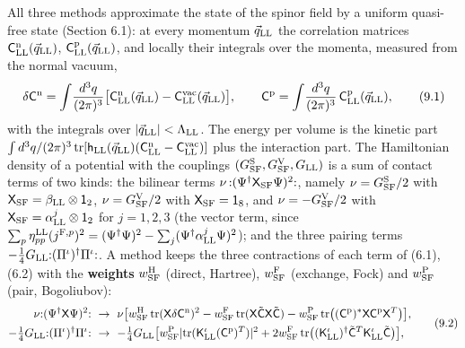 \documentclass[
  10pt,
]{article}
\begin{document}
All three methods approximate the state of the spinor field by a uniform
quasi-free state (Section 6.1): at every momentum \(\vec q_{\rm LL}\)
the correlation matrices
\(\mathsf C^{\rm n}_{\rm LL}(\vec q_{\rm LL})\),
\(\mathsf C^{\rm p}_{\rm LL}(\vec q_{\rm LL})\), and locally their
integrals over the momenta, measured from the normal vacuum,
\[\delta\mathsf C^{\rm n}=\int\!\frac{d^3q}{(2\pi)^3}\big[\mathsf C^{\rm n}_{\rm LL}(\vec q_{\rm LL})-\mathsf C^{\rm vac}_{\rm LL}(\vec q_{\rm LL})\big],\qquad\mathsf C^{\rm p}=\int\!\frac{d^3q}{(2\pi)^3}\,\mathsf C^{\rm p}_{\rm LL}(\vec q_{\rm LL}),\tag{9.1}\]
with the integrals over
\(\lvert\vec q_{\rm LL}\rvert<\Lambda_{\rm LL}\). The energy per volume
is the kinetic part
\(\int d^3q/(2\pi)^3\,\mathrm{tr}[\mathsf h_{\rm LL}(\vec q_{\rm LL})(\mathsf C^{\rm n}_{\rm LL}-\mathsf C^{\rm vac}_{\rm LL})]\)
plus the interaction part. The Hamiltonian density of a potential with
the couplings \((G^{\rm S}_{\rm SF},G^{\rm V}_{\rm SF},G_{\rm LL})\) is
a sum of contact terms of two kinds: the bilinear terms
\(\nu\,{:}(\Psi^\dagger\mathsf X_{\rm SF}\Psi)^2{:}\), namely
\(\nu=G^{\rm S}_{\rm SF}/2\) with
\(\mathsf X_{\rm SF}=\beta_{\rm LL}\otimes\mathsf 1_2\),
\(\nu=G^{\rm V}_{\rm SF}/2\) with \(\mathsf X_{\rm SF}=\mathsf 1_8\),
and \(\nu=-G^{\rm V}_{\rm SF}/2\) with
\(\mathsf X_{\rm SF}=\alpha^j_{\rm LL}\otimes\mathsf 1_2\) for
\(j=1,2,3\) (the vector term, since
\(\sum_p\eta^{\rm LL}_{pp}(j^{{\rm F},p})^2=(\Psi^\dagger\Psi)^2-\sum_j(\Psi^\dagger\alpha^j_{\rm LL}\Psi)^2\));
and the three pairing terms
\(-\tfrac14G_{\rm LL}{:}(\Pi^\iota)^\dagger\Pi^\iota{:}\). A method
keeps the three contractions of each term of (6.1), (6.2) with the
\textbf{weights} \(w^{\rm H}_{\rm SF}\) (direct, Hartree),
\(w^{\rm F}_{\rm SF}\) (exchange, Fock) and \(w^{\rm P}_{\rm SF}\)
(pair, Bogoliubov):
\[\begin{aligned}\nu{:}(\Psi^\dagger\mathsf X\Psi)^2{:}\ &\to\ \nu\big[w^{\rm H}_{\rm SF}\,\mathrm{tr}(\mathsf X\delta\mathsf C^{\rm n})^2-w^{\rm F}_{\rm SF}\,\mathrm{tr}(\mathsf X\tilde{\mathsf C}\mathsf X\tilde{\mathsf C})-w^{\rm P}_{\rm SF}\,\mathrm{tr}\big((\mathsf C^{\rm p})^*\mathsf X\mathsf C^{\rm p}\mathsf X^T\big)\big],\\-\tfrac14G_{\rm LL}{:}(\Pi^\iota)^\dagger\Pi^\iota{:}\ &\to\ -\tfrac14G_{\rm LL}\big[w^{\rm P}_{\rm SF}\lvert\mathrm{tr}(\mathsf K^\iota_{\rm LL}(\mathsf C^{\rm p})^T)\rvert^2+2w^{\rm F}_{\rm SF}\,\mathrm{tr}\big((\mathsf K^\iota_{\rm LL})^\dagger\tilde{\mathsf C}^T\mathsf K^\iota_{\rm LL}\tilde{\mathsf C}\big)\big],\end{aligned}\tag{9.2}\]
\end{document}
